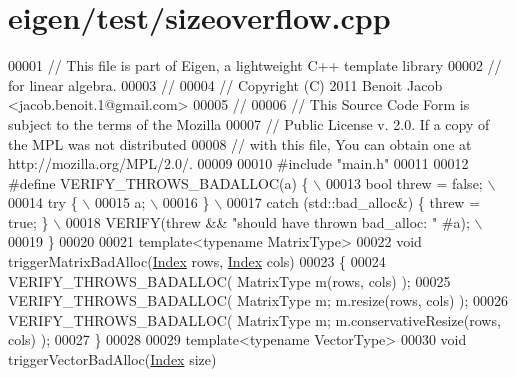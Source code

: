 \hypertarget{eigen_2test_2sizeoverflow_8cpp_source}{}\section{eigen/test/sizeoverflow.cpp}
\label{eigen_2test_2sizeoverflow_8cpp_source}

\begin{DoxyCode}
00001 \textcolor{comment}{// This file is part of Eigen, a lightweight C++ template library}
00002 \textcolor{comment}{// for linear algebra.}
00003 \textcolor{comment}{//}
00004 \textcolor{comment}{// Copyright (C) 2011 Benoit Jacob <jacob.benoit.1@gmail.com>}
00005 \textcolor{comment}{//}
00006 \textcolor{comment}{// This Source Code Form is subject to the terms of the Mozilla}
00007 \textcolor{comment}{// Public License v. 2.0. If a copy of the MPL was not distributed}
00008 \textcolor{comment}{// with this file, You can obtain one at http://mozilla.org/MPL/2.0/.}
00009 
00010 \textcolor{preprocessor}{#include "main.h"}
00011 
00012 \textcolor{preprocessor}{#define VERIFY\_THROWS\_BADALLOC(a) \{                           \(\backslash\)}
00013 \textcolor{preprocessor}{    bool threw = false;                                       \(\backslash\)}
00014 \textcolor{preprocessor}{    try \{                                                     \(\backslash\)}
00015 \textcolor{preprocessor}{      a;                                                      \(\backslash\)}
00016 \textcolor{preprocessor}{    \}                                                         \(\backslash\)}
00017 \textcolor{preprocessor}{    catch (std::bad\_alloc&) \{ threw = true; \}                 \(\backslash\)}
00018 \textcolor{preprocessor}{    VERIFY(threw && "should have thrown bad\_alloc: " #a);     \(\backslash\)}
00019 \textcolor{preprocessor}{  \}}
00020 
00021 \textcolor{keyword}{template}<\textcolor{keyword}{typename} MatrixType>
00022 \textcolor{keywordtype}{void} triggerMatrixBadAlloc(\hyperlink{namespace_eigen_a62e77e0933482dafde8fe197d9a2cfde}{Index} rows, \hyperlink{namespace_eigen_a62e77e0933482dafde8fe197d9a2cfde}{Index} cols)
00023 \{
00024   VERIFY\_THROWS\_BADALLOC( MatrixType m(rows, cols) );
00025   VERIFY\_THROWS\_BADALLOC( MatrixType m; m.resize(rows, cols) );
00026   VERIFY\_THROWS\_BADALLOC( MatrixType m; m.conservativeResize(rows, cols) );
00027 \}
00028 
00029 \textcolor{keyword}{template}<\textcolor{keyword}{typename} VectorType>
00030 \textcolor{keywordtype}{void} triggerVectorBadAlloc(\hyperlink{namespace_eigen_a62e77e0933482dafde8fe197d9a2cfde}{Index} size)

\end{DoxyCode}
